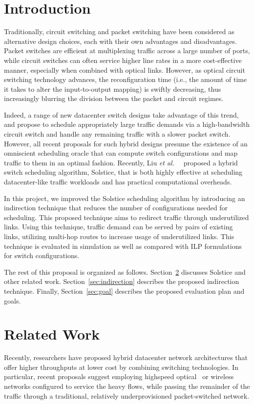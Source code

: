 \section{Introduction}

Traditionally, circuit switching and packet switching have been
considered as alternative design choices, each with their own advantages
and disadvantages. Packet switches are efficient at multiplexing traffic
across a large number of ports, while circuit switches can often service
higher line rates in a more cost-effective manner, especially when
combined with optical links. However, as optical circuit switching
technology advances, the reconfiguration time (i.e., the amount of time
it takes to alter the input-to-output mapping) is swiftly decreasing,
thus increasingly blurring the division between the packet and circuit
regimes.

Indeed, a range of new datacenter switch designs take advantage of this
trend, and propose to schedule appropriately large traffic demands via a
high-bandwidth circuit switch and handle any remaining traffic with a
slower packet switch. However, all recent proposals for such hybrid
designs presume the existence of an omniscient scheduling oracle that
can compute switch configurations and map traffic to them in an optimal
fashion. Recently, Liu \textit{et al.\ }~\cite{Liu:2015} proposed a
hybrid switch scheduling algorithm, Solstice, that is both
highly effective at scheduling datacenter-like traffic workloads and has
practical computational overheads.

In this project, we improved the Solstice scheduling algorithm by
introducing an indirection technique that reduces the number of
configurations needed for scheduling. This proposed technique
aims to redirect traffic through underutilized links. Using this technique,
traffic demand can be served by pairs of existing links, utilizing
multi-hop routes to increase usage of underutilized links.
This technique is evaluated in simulation as well as compared with ILP
formulations for switch configurations.

The rest of this proposal is organized as follows.
Section~\ref{sec:related} discusses Solstice and other related work.
Section~\ref{sec:indirection} describes the proposed indirection
technique. Finally, Section~\ref{sec:goal} describes the proposed evaluation plan
and goals.

\section{Related Work}
\label{sec:related}
Recently, researchers have proposed hybrid datacenter network architectures
that offer higher throughputs at lower cost by combining switching
technologies. In particular, recent proposals suggest employing
highspeed optical~\cite{Chen:2012, Farrington:2010, Wang:2010} or
wireless~\cite{Halperin:2011, Kandula:2009, Zhou:2012} networks
configured to service the heavy flows, while passing the remainder of
the traffic through a traditional, relatively underprovisioned
packet-switched network. 

